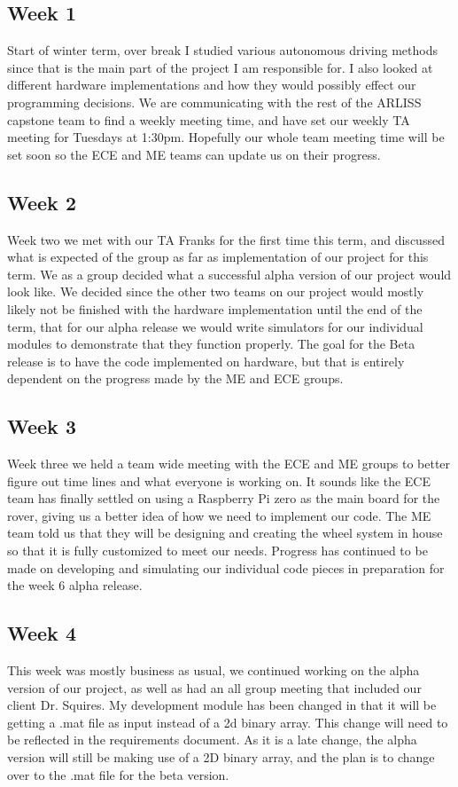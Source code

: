 \documentclass[10pt,letterpaper,onecolumn,draftclsnofoot,journal]{IEEEtran}
\begin{document}
\subsection{Week 1}
Start of winter term, over break I studied various autonomous driving methods since that is the main part of the project I am responsible for. I also looked at different hardware implementations and how they would possibly effect our programming decisions. We are communicating with the rest of the ARLISS capstone team to find a weekly meeting time, and have set our weekly TA meeting for Tuesdays at 1:30pm. Hopefully our whole team meeting time will be set soon so the ECE and ME teams can update us on their progress.

\subsection{Week 2}
Week two we met with our TA Franks for the first time this term, and discussed what is expected of the group as far as implementation of our project for this term. We as a group decided what a successful alpha version of our project would look like. We decided since the other two teams on our project would mostly likely not be finished with the hardware implementation until the end of the term, that for our alpha release we would write simulators for our individual modules to demonstrate that they function properly. The goal for the Beta release is to have the code implemented on hardware, but that is entirely dependent on the progress made by the ME and ECE groups.


\subsection{Week 3}
Week three we held a team wide meeting with the ECE and ME groups to better figure out time lines and what everyone is working on. It sounds like the ECE team has finally settled on using a Raspberry Pi zero as the main board for the rover, giving us a better idea of how we need to implement our code. The ME team told us that they will be designing and creating the wheel system in house so that it is fully customized to meet our needs. Progress has continued to be made on developing and simulating our individual code pieces in preparation for the week 6 alpha release.

\subsection{Week 4}
This week was mostly business as usual, we continued working on the alpha version of our project, as well as had an all group meeting that included our client Dr. Squires. My development module has been changed in that it will be getting a .mat file as input instead of a 2d binary array. This change will need to be reflected in the requirements document. As it is a late change, the alpha version will still be making use of a 2D binary array, and the plan is to change over to the .mat file for the beta version.
\end{document}
